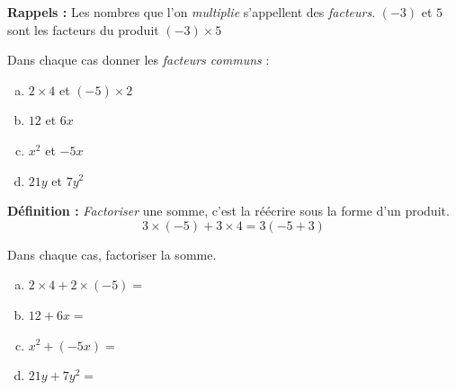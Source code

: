 \documentclass[../main.tex]{subfiles}
\begin{document}
    \begin{simplebox}
        {\bfseries Rappels :} Les nombres que l'on {\itshape multiplie} s'appellent des
        {\itshape facteurs}.
        {\centering $(-3)$ et $5$ sont les facteurs du produit $(-3)\times 5$}
    \end{simplebox}
    Dans chaque cas donner les {\itshape facteurs communs} :
    \begin{enumerate}[(a), font=\bfseries]
        \item $2\times 4$ et $(-5)\times 2$\vfill
        \item $12$ et $6x$\vfill
        \item $x^2$ et $-5x$\vfill
        \item $21y$ et $7y^2$\vfill
    \end{enumerate}
    \begin{simplebox}
        {\bfseries Définition :} {\itshape Factoriser} une somme, c'est la réécrire
        sous la forme d'un produit.
        $$3\times (-5)+3\times 4=3(-5+3)$$
    \end{simplebox}
    Dans chaque cas, factoriser la somme.
    \begin{enumerate}[(a), font=\bfseries]
        \item $2\times 4+2\times(-5)=$\vfill
        \item $12+6x=$\vfill
        \item $x^2+(-5x)=$\vfill
        \item $21y+7y^2=$
    \end{enumerate}
\end{document}
